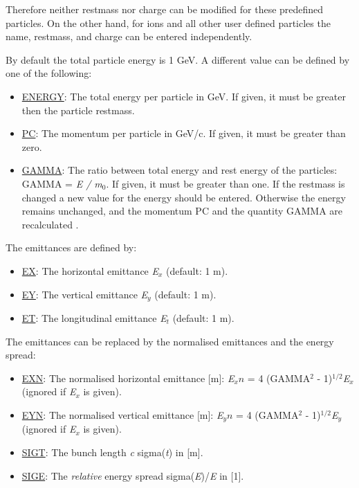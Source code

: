 Therefore neither restmass nor charge can be modified for these
predefined particles. On the other hand, for ions and all other user
defined particles the name, restmass, and charge can be entered
independently.  

By default the total particle energy is 1 GeV. A different value can be 
defined by one of the following: 
 
\begin{itemize}
   \item \href{energy}{ENERGY}: The total energy per particle in
     GeV. If given, it must be greater then the particle restmass.  
   \item \href{pc}{PC}: The momentum per particle in GeV/c. If
     given, it must be greater than zero.  
   \item \href{gamma}{GAMMA}: The ratio between total energy and
     rest energy of the particles: GAMMA = \textit{E / m$_0$}. If
     given, it must be greater than one. If the restmass is changed
     a new value for the energy should be entered. Otherwise the
     energy remains unchanged, and the momentum PC and the quantity
     GAMMA are recalculated . 
\end{itemize}  

The emittances are defined by: 
\begin{itemize}
   \item \href{ex}{EX}: The horizontal emittance \textit{E$_x$} (default: 1 m). 
   \item \href{ey}{EY}: The vertical emittance \textit{E$_y$} (default: 1 m). 
   \item \href{et}{ET}: The longitudinal emittance \textit{E$_t$} (default: 1 m). 
\end{itemize}  

The emittances can be replaced by the normalised emittances and the
energy spread:  
\begin{itemize}
   \item \href{exn}{EXN}: The normalised horizontal emittance [m]:
     \textit{E$_xn$} = 4 (GAMMA$^2$ - 1)$^{1/2}$\textit{E$_x$} (ignored
     if \textit{E$_x$} is given).  
   \item \href{eyn}{EYN}: The normalised vertical emittance [m]:
     \textit{E$_yn$} = 4 (GAMMA$^2$ - 1)$^{1/2}$\textit{E$_y$} (ignored
     if \textit{E$_x$} is given).  
   \item \href{sigt}{SIGT}: The bunch length \textit{c}
     sigma(\textit{t}) in [m].  
   \item \href{sige}{SIGE}: The \emph{relative} energy spread
     sigma(\textit{E})/\textit{E} in [1].  
\end{itemize} 

